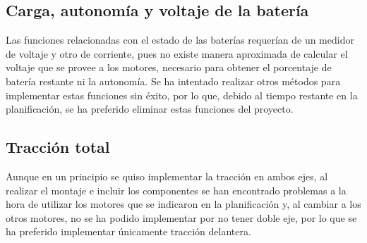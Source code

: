 \subsection*{Carga, autonomía y voltaje de la batería}

Las funciones relacionadas con el estado de las baterías requerían de un medidor de voltaje y otro de corriente, pues no existe manera aproximada de calcular el voltaje que se provee a los motores, necesario para obtener el porcentaje de batería restante ni la autonomía. Se ha intentado realizar otros métodos para implementar estas funciones sin éxito, por lo que, debido al tiempo restante en la planificación, se ha preferido eliminar estas funciones del proyecto. 

\subsection*{Tracción total}

Aunque en un principio se quiso implementar la tracción en ambos ejes, al realizar el montaje e incluir los componentes se han encontrado problemas a la hora de utilizar los motores que se indicaron en la planificación y, al cambiar a los otros motores, no se ha podido implementar por no tener doble eje, por lo que se ha preferido implementar únicamente tracción delantera. 